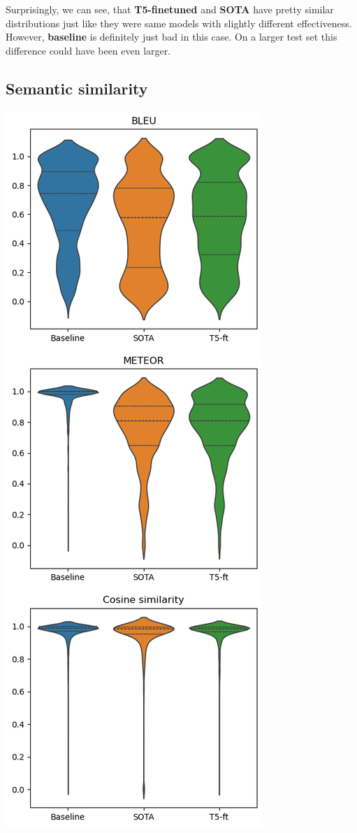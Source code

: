 \begin{multicols*}{2}
Surprisingly, we can see, that \textbf{T5-finetuned} and \textbf{SOTA} have
pretty similar distributions just like they were same models with slightly
different effectiveness. However, \textbf{baseline} is definitely just bad in
this case. On a larger test set this difference could have been even larger.

\subsection{Semantic similarity}

\begin{minipage}{\linewidth}
    \includegraphics[scale=0.4]{figures/final/semantic.png}%
    \label{fig:eval:toxdistrlim}%
\end{minipage}


\end{multicols*}
